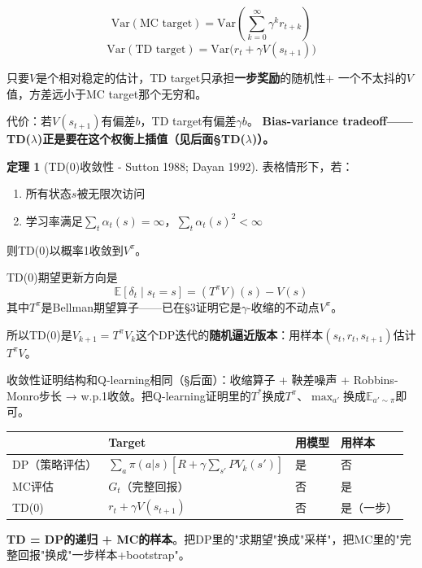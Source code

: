 \documentclass[11pt,a4paper]{article}
\theoremstyle{definition}
\newtheorem{theorem}{定理}[section]
\begin{document}
\begin{calculation}[为什么TD降方差]
\[
\text{Var}(\text{MC target}) = \text{Var}\left(\sum_{k=0}^\infty \gamma^k r_{t+k}\right)
\]
\[
\text{Var}(\text{TD target}) = \text{Var}\big(r_t + \gamma V(s_{t+1})\big)
\]

只要$V$是个相对稳定的估计，TD target只承担\textbf{一步奖励}的随机性$+$ 一个不太抖的$V$值，方差远小于MC target那个无穷和。

代价：若$V(s_{t+1})$有偏差$b$，TD target有偏差$\gamma b$。
\textbf{Bias-variance tradeoff——TD($\lambda$)正是要在这个权衡上插值（见后面§TD($\lambda$)）。}
\end{calculation}

\begin{theorem}[TD(0)收敛性 - Sutton 1988; Dayan 1992]
表格情形下，若：
\begin{enumerate}
\item 所有状态$s$被无限次访问
\item 学习率满足$\sum_t \alpha_t(s) = \infty$，$\sum_t \alpha_t(s)^2 < \infty$
\end{enumerate}
则TD(0)以概率1收敛到$V^\pi$。
\end{theorem}

\begin{proofidea}
TD(0)期望更新方向是
\[
\mathbb{E}[\delta_t \mid s_t = s] = (T^\pi V)(s) - V(s)
\]
其中$T^\pi$是Bellman期望算子——已在§3证明它是$\gamma$-收缩的不动点$V^\pi$。

所以TD(0)是$V_{k+1} = T^\pi V_k$这个DP迭代的\textbf{随机逼近版本}：用样本$(s_t, r_t, s_{t+1})$估计$T^\pi V$。

收敛性证明结构和Q-learning相同（§后面）：收缩算子 + 鞅差噪声 + Robbins-Monro步长 → w.p.1收敛。把Q-learning证明里的$T^*$换成$T^\pi$、$\max_{a'}$换成$\mathbb{E}_{a'\sim\pi}$即可。
\end{proofidea}

\begin{plainwords}[三种prediction方法的统一视图]
\begin{center}
\begin{tabular}{l|l|l|l}
\toprule
& Target & 用模型 & 用样本 \\
\midrule
DP（策略评估） & $\sum_a \pi(a|s)[R + \gamma\sum_{s'} P V_k(s')]$ & 是 & 否 \\
MC评估 & $G_t$（完整回报） & 否 & 是 \\
TD(0) & $r_t + \gamma V(s_{t+1})$ & 否 & 是（一步） \\
\bottomrule
\end{tabular}
\end{center}

\textbf{TD = DP的递归 + MC的样本}。把DP里的"求期望"换成"采样"，把MC里的"完整回报"换成"一步样本+bootstrap"。
\end{plainwords}
\end{document}
